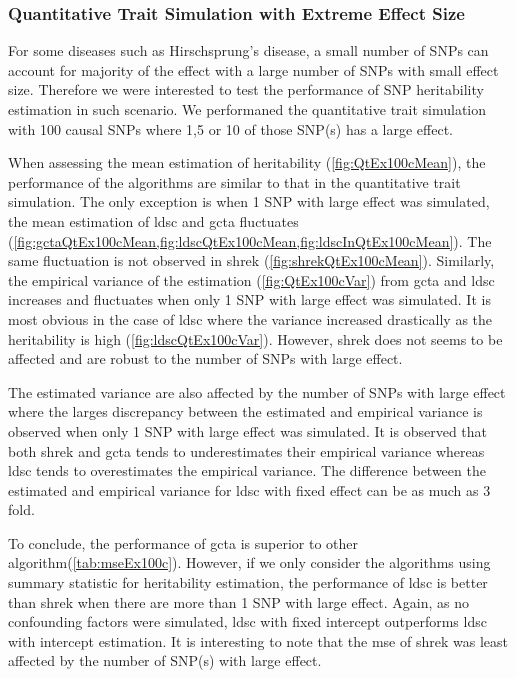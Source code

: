 		
		
		\subsubsection{Quantitative Trait Simulation with Extreme Effect Size}
		
		For some diseases such as Hirschsprung's disease, a small number of \glspl{SNP} can account for majority of the effect with a large number of \glspl{SNP} with small effect size. 
		Therefore we were interested to test the performance of \gls{SNP} heritability estimation in such scenario.
		We performaned the quantitative trait simulation with 100 causal \glspl{SNP} where 1,5 or 10 of those \gls{SNP}(s) has a large effect.
		
		When assessing the mean estimation of heritability (\cref{fig:QtEx100cMean}), the performance of the algorithms are similar to that in the quantitative trait simulation.
		The only exception is when 1 \gls{SNP} with large effect was simulated, the mean estimation of \gls{ldsc} and \gls{gcta} fluctuates (\cref{fig:gctaQtEx100cMean,fig:ldscQtEx100cMean,fig:ldscInQtEx100cMean}).
		The same fluctuation is not observed in \gls{shrek} (\cref{fig:shrekQtEx100cMean}). 
		Similarly, the empirical variance of the estimation (\cref{fig:QtEx100cVar}) from \gls{gcta} and \gls{ldsc} increases and fluctuates when only 1 \gls{SNP} with large effect was simulated.
		It is most obvious in the case of \gls{ldsc} where the variance increased drastically as the heritability is high (\cref{fig:ldscQtEx100cVar}).
		However, \gls{shrek} does not seems to be affected and are robust to the number of \glspl{SNP} with large effect. 
		
		The estimated variance are also affected by the number of \glspl{SNP} with large effect where the larges discrepancy between the estimated and empirical variance is observed when only 1 \gls{SNP} with large effect was simulated. 
		It is observed that both \gls{shrek} and \gls{gcta} tends to underestimates their empirical variance whereas \gls{ldsc} tends to overestimates the empirical variance. 
		The difference between the estimated and empirical variance for \gls{ldsc} with fixed effect can be as much as 3 fold. 
		
		To conclude, the performance of \gls{gcta} is superior to other algorithm(\cref{tab:mseEx100c}).
		However, if we only consider the algorithms using summary statistic for heritability estimation, the performance of \gls{ldsc} is better than \gls{shrek} when there are more than 1 \gls{SNP} with large effect. 
		Again, as no confounding factors were simulated, \gls{ldsc} with fixed intercept outperforms \gls{ldsc} with intercept estimation.
		It is interesting to note that the \gls{mse} of \gls{shrek} was least affected by the number of \gls{SNP}(s) with large effect.
		   
